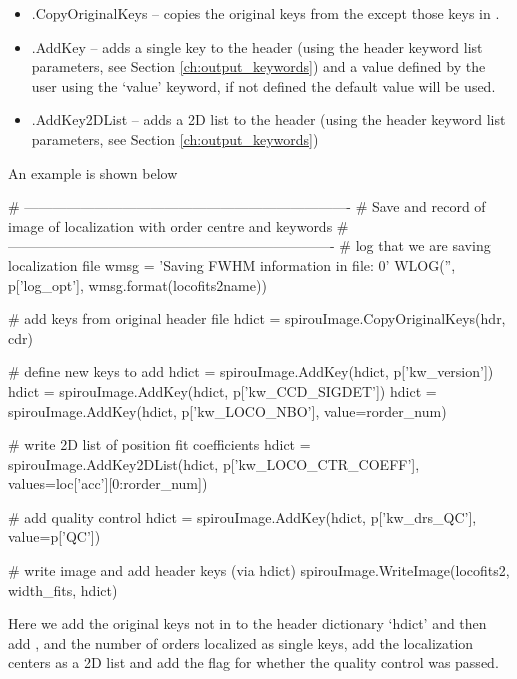 \begin{itemize}
	\item \spirouImage.CopyOriginalKeys -- copies the original keys from the  except those keys in .

	\item \spirouImage.AddKey -- adds a single key to the header (using the header keyword list parameters, see Section \ref{ch:output_keywords}) and a value defined by the user using the `value' keyword, if not defined the default value will be used.

	\item \spirouImage.AddKey2DList -- adds a 2D list to the header (using the header keyword list parameters, see Section \ref{ch:output_keywords})
\end{itemize}

\vspace{0.5cm}
\begin{minipage}{\textwidth}
\noindent An example is shown below
\begin{pythonbox}
# ----------------------------------------------------------------------
# Save and record of image of localization with order centre and keywords
# ----------------------------------------------------------------------
# log that we are saving localization file
wmsg = 'Saving FWHM information in file: {0}'
WLOG('', p['log_opt'], wmsg.format(locofits2name))

# add keys from original header file
hdict = spirouImage.CopyOriginalKeys(hdr, cdr)

# define new keys to add
hdict = spirouImage.AddKey(hdict, p['kw_version'])
hdict = spirouImage.AddKey(hdict, p['kw_CCD_SIGDET'])
hdict = spirouImage.AddKey(hdict, p['kw_LOCO_NBO'], value=rorder_num)

# write 2D list of position fit coefficients
hdict = spirouImage.AddKey2DList(hdict, p['kw_LOCO_CTR_COEFF'],
                                 values=loc['acc'][0:rorder_num])

# add quality control
hdict = spirouImage.AddKey(hdict, p['kw_drs_QC'], value=p['QC'])

# write image and add header keys (via hdict)
spirouImage.WriteImage(locofits2, width_fits, hdict)
\end{pythonbox}
\begin{note}
Here we add the original keys not in  to the header dictionary `hdict' and then add ,  and  {the number of orders localized} as single keys, add the localization centers as a 2D list and add the flag for whether the quality control was passed.
\end{note}
\end{minipage}


